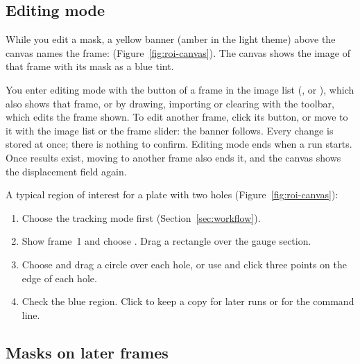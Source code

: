 \subsection{Editing mode}
\label{sec:roi-editing}


While you edit a mask, a yellow banner (amber in the light theme) above the canvas names the
frame:  (Figure~\ref{fig:roi-canvas}). The canvas
shows the image of that frame with its mask as a blue tint.

You enter editing mode with the  button of a frame in the image list (,
 or ), which also shows that frame, or by drawing, importing or clearing with
the toolbar, which edits the frame shown. To edit another frame, click its  button, or move to it with
the image list or the frame slider: the banner follows. Every change is stored at once; there is
nothing to confirm. Editing mode ends when a run starts. Once results exist, moving to another
frame also ends it, and the canvas shows the displacement field again.

A typical region of interest for a plate with two holes (Figure~\ref{fig:roi-canvas}):
\begin{enumerate}
  \item Choose the tracking mode first (Section~\ref{sec:workflow}).
  \item Show frame~1 and choose . Drag a rectangle over the gauge
        section.
  \item Choose  and drag a circle over each hole, or use
         and click three points on the edge of each hole.
  \item Check the blue region. Click  to keep a copy for later runs or for the command
        line.
\end{enumerate}

\subsection{Masks on later frames}
\label{sec:roi-later-frames}

